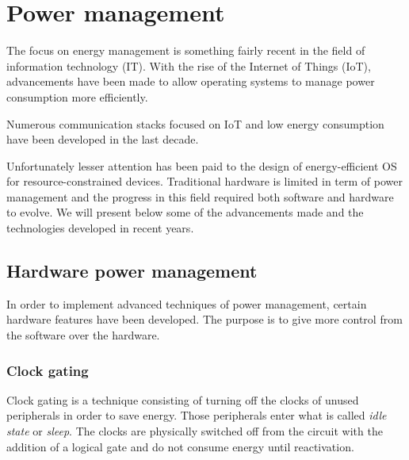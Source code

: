 \section{Power management}



The focus on energy management is something fairly recent in the field of information technology (IT).
With the rise of the Internet of Things (IoT), advancements have been made to allow operating systems to manage power consumption more efficiently.

Numerous communication stacks focused on IoT and low energy consumption have been developed in the last decade.

Unfortunately lesser attention has been paid to the design of energy-efficient OS for resource-constrained devices.
Traditional hardware is limited in term of power management and the progress in this field required both software and hardware to evolve.
We will present below some of the advancements made and the technologies developed in recent years\cite{power-mgmt}.


\subsection{Hardware power management}
In order to implement advanced techniques of power management, certain hardware features have been developed.
The purpose is to give more control from the software over the hardware.

\subsubsection{Clock gating}
Clock gating is a technique consisting of turning off the clocks of unused peripherals in order to save energy.
Those peripherals enter what is called \textit{idle state} or \textit{sleep}.
The clocks are physically switched off from the circuit with the addition of a logical gate and do not consume energy until reactivation.

